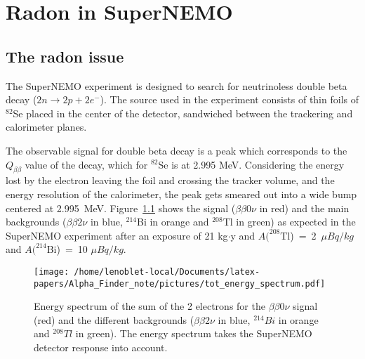 \documentclass[main.tex]{subfiles}
\begin{document}
\chapter{Radon in SuperNEMO}\label{chap:Radon}





\section{The radon issue}


The SuperNEMO experiment is designed to search for neutrinoless double beta decay ($ 2n \rightarrow 2p + 2e^-$). The source used in the experiment consists of thin foils of $^{82}$Se placed in the center of the detector, sandwiched between the trackering and calorimeter planes. 

\bigskip

\noindent The observable signal for double beta decay is a peak which corresponds to the $Q_{\beta \beta}$ value of the decay, which for $^{82}$Se is at 2.995 MeV. Considering the energy lost by the electron leaving the foil and crossing
the tracker volume, and the energy resolution of the calorimeter, the peak gets smeared out into a wide bump centered at 2.995~MeV. Figure~\ref{energySpectrum} shows the signal ($\beta \beta 0 \nu$ in red) and the main backgrounds ($\beta \beta 2 \nu$ in blue, $^{214}$Bi in orange and $^{208}$Tl in green) as expected in the SuperNEMO experiment after an exposure of 21 kg$\cdot$y and $A(^{208}$Tl)~=~2~$\mu Bq/kg$  and  $A(^{214}$Bi)~=~10 $\mu Bq/kg$.

\begin{figure}[h!]
\begin{center}
\texttt{[image: /home/lenoblet-local/Documents/latex-papers/Alpha\_Finder\_note/pictures/tot\_energy\_spectrum.pdf]}
\caption{Energy spectrum of the sum of the 2 electrons for the $\beta \beta 0 \nu$ signal (red) and the different backgrounds ($\beta \beta 2 \nu$ in blue, $^{214}Bi$ in orange and $^{208}Tl$ in green). The energy spectrum takes the SuperNEMO detector response into account.}
\label{energySpectrum}
\end{center}
\end{figure}
\end{document}
